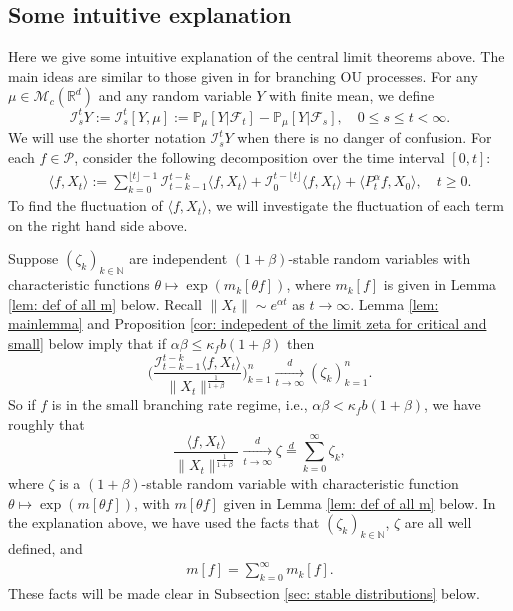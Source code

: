 \documentclass[12pt,a4paper]{amsart}
\theoremstyle{plain}
\theoremstyle{definition}
\numberwithin{equation}{section}
\begin{document}
\subsection{Some intuitive explanation}
Here we give some intuitive explanation of the central limit theorems above.
The main ideas are similar to those given in \cite{MarksMilos2018CLT} for branching OU processes.
For any $\mu\in \mathcal M_c(\mathbb R^d)$ and any random variable $Y$ with finite mean, we define
\begin{equation}
  \label{Ist}
  \mathcal I_s^t Y
  := \mathcal I_s^t [Y, \mu]
  := \mathbb P_\mu[Y|\mathscr F_t] - \mathbb P_\mu[Y|\mathscr F_s],
  \quad 0 \leq s \leq t <\infty.
\end{equation}
We will use the shorter notation $\mathcal I_s^t Y$ when there is no danger of confusion.
For each $f\in \mathcal{P}$, consider the following decomposition over the time interval $[0,t]$:
\begin{align}
  \langle f,X_t\rangle
  := \sum_{k=0}^{\lfloor t \rfloor-1} \mathcal I_{t-k-1}^{t-k}\langle f ,X_t\rangle+\mathcal I_0^{t-\lfloor t \rfloor}\langle f ,X_t\rangle + \langle P^\alpha_tf,X_0\rangle,
  \quad t\geq 0.
\end{align}
To find the fluctuation of $\langle f,X_t\rangle$, we will investigate the fluctuation of each term on the right hand side above.

Suppose $(\zeta_k)_{k \in \mathbb N}$ are independent $(1+\beta)$-stable random variables with characteristic functions $\theta\mapsto \exp( m_k[\theta f])$, where $m_k[f]$ is given in Lemma \ref{lem: def of all m} below.
Recall $\|X_t\|\sim e^{\alpha t}$ as $t\to\infty$.
Lemma \ref{lem: mainlemma} and Proposition \ref{cor: indepedent of the limit zeta for critical and small} below imply that if $\alpha\beta \leq \kappa_f b(1+\beta) $ then
\[
  \bigg(\frac{\mathcal I^{t-k}_{t-k-1} \langle f,X_t\rangle}{\|X_t\|^{\frac{1}{1+\beta}}} \bigg)_{k=1}^n
  \xrightarrow [t\to \infty]{d} (\zeta_k)_{k=1}^n.
\]
So if $f$ is in the small branching rate regime, i.e., $\alpha \beta < \kappa_f b(1+\beta)$, we have roughly that
\[
  \frac{\langle f,X_t\rangle}{\|X_t\|^{\frac{1}{1+\beta}}} 
  \xrightarrow[t\to \infty]{d} \zeta\overset{d}{=}\sum_{k=0}^\infty \zeta_k,
\]
where $\zeta$ is a $(1+\beta)$-stable random variable with characteristic function $\theta\mapsto \exp(m[\theta f])$, with $m[\theta f]$ given in Lemma \ref{lem: def of all m} below.
In the explanation above, we have used the facts that $(\zeta_k)_{k\in \mathbb N}$, $\zeta$ are all well defined, and
\begin{align}
  \label{eq: equatlity for mf for small rate}
  m[f] 
  = \sum_{k=0}^\infty m_k[ f].
\end{align}
These facts will be made clear in Subsection \ref{sec: stable distributions} below.
\end{document}
